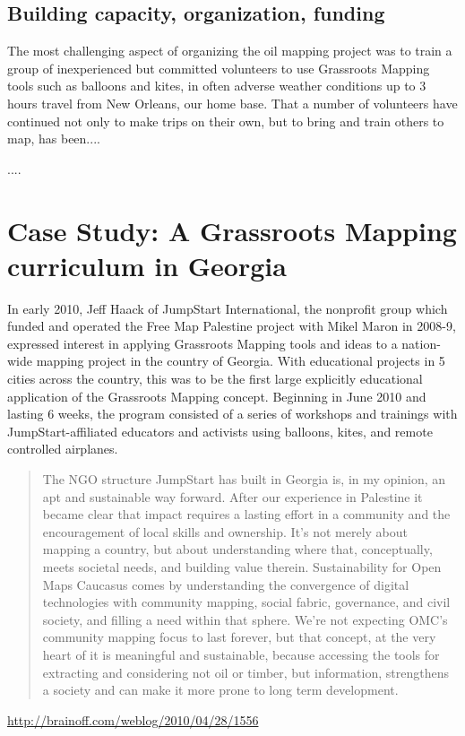 \documentclass[11pt]{report}
\begin{document}
\section{Building capacity, organization, funding}

The most challenging aspect of organizing the oil mapping project was to train a group of inexperienced but committed volunteers to use Grassroots Mapping tools such as balloons and kites, in often adverse weather conditions up to 3 hours travel from New Orleans, our home base. That a number of volunteers have continued not only to make trips on their own, but to bring and train others to map, has been....

....  


\chapter{Case Study: A Grassroots Mapping curriculum in Georgia}

In early 2010, Jeff Haack of JumpStart International, the nonprofit group which funded and operated the Free Map Palestine project with Mikel Maron in 2008-9, expressed interest in applying Grassroots Mapping tools and ideas to a nation-wide mapping project in the country of Georgia. With educational projects in 5 cities across the country, this was to be the first large explicitly educational application of the Grassroots Mapping concept. Beginning in June 2010 and lasting 6 weeks, the program consisted of a series of workshops and trainings with JumpStart-affiliated educators and activists using balloons, kites, and remote controlled airplanes.

\begin{quote}The NGO structure JumpStart has built in Georgia is, in my opinion, an apt and sustainable way forward. After our experience in Palestine it became clear that impact requires a lasting effort in a community and the encouragement of local skills and ownership. It’s not merely about mapping a country, but about understanding where that, conceptually, meets societal needs, and building value therein. Sustainability for Open Maps Caucasus comes by understanding the convergence of digital technologies with community mapping, social fabric, governance, and civil society, and filling a need within that sphere. We’re not expecting OMC’s community mapping focus to last forever, but that concept, at the very heart of it is meaningful and sustainable, because accessing the tools for extracting and considering not oil or timber, but information, strengthens a society and can make it more prone to long term development.\end{quote} \url{http://brainoff.com/weblog/2010/04/28/1556}
\end{document}
